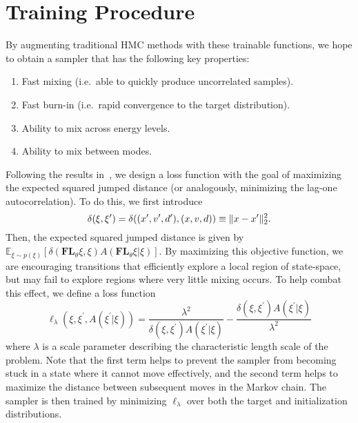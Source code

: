 \documentclass[../main.tex]{subfiles}
\begin{document}
%
\section{Training Procedure}
%
By augmenting traditional HMC methods with these trainable functions, we hope
to obtain a sampler that has the following key properties:
%
\begin{enumerate}
    \item Fast mixing (i.e.\ able to quickly produce uncorrelated samples).
    \item Fast burn-in (i.e.\ rapid convergence to the target distribution).
    \item Ability to mix across energy levels.
    \item Ability to mix between modes.
\end{enumerate}
%
Following the results in~\cite{10.2307/24308995}, we design a loss function
with the goal of maximizing the expected squared jumped distance (or
analogously, minimizing the lag-one autocorrelation).
%
To do this, we first introduce 
\begin{equation}
  \delta(\xi, {\xi^{\prime}}) = \delta((x^{\prime}, v^{\prime}, d^{\prime}), (x, v, d))
  \equiv \| x - x^{\prime}\|^2_2.  \label{eq:metric_orig}
\end{equation}
%
Then, the expected squared jumped distance is given by $\mathbb{E}_{\xi\sim
p(\xi)} \left[\delta(\mathbf{FL}_{\theta}\xi, \xi) A(\mathbf{FL}_{\theta}\xi |
\xi)\right]$.
%
By maximizing this objective function, we are encouraging transitions that
efficiently explore a local region of state-space, but may fail to explore
regions where very little mixing occurs.
%
To help combat this effect, we define a loss function
%
\begin{equation}
    \ell_{\lambda}(\xi, \xi^{\prime}, A(\xi^{\prime}|\xi)) =
        \frac{\lambda^2}{\delta(\xi,\xi^{\prime}) A(\xi^{\prime}|\xi)} -
        \frac{\delta(\xi,\xi^{\prime}) A(\xi^{\prime}|\xi)}{\lambda^2}
    \label{eq:loss_ell}
\end{equation}
%
where $\lambda$ is a scale parameter describing the characteristic length scale
of the problem.
%
Note that the first term helps to prevent the sampler from becoming stuck in a
state where it cannot move effectively, and the second term helps to maximize
the distance between subsequent moves in the Markov chain.  The sampler is then
trained by minimizing $\ell_{\lambda}$ over both the target and initialization
distributions.
\end{document}
